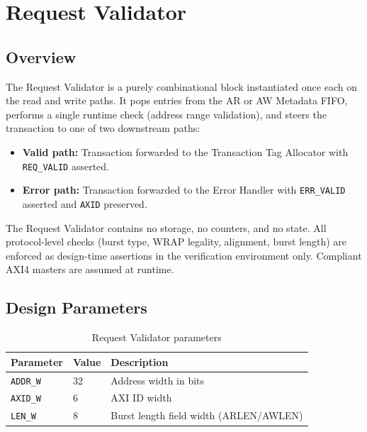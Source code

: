 \section{Request Validator}
\subsection{Overview}

The Request Validator is a purely combinational block instantiated once
each on the read and write paths. It pops entries from the AR or AW
Metadata FIFO, performs a single runtime check (address range
validation), and steers the transaction to one of two downstream paths:

\begin{itemize}
  \item \textbf{Valid path:} Transaction forwarded to the Transaction
        Tag Allocator with \texttt{REQ\_VALID} asserted.
  \item \textbf{Error path:} Transaction forwarded to the Error Handler
        with \texttt{ERR\_VALID} asserted and \texttt{AXID} preserved.
\end{itemize}

The Request Validator contains no storage, no counters, and no state.
All protocol-level checks (burst type, WRAP legality, alignment, burst
length) are enforced as design-time assertions in the verification
environment only. Compliant AXI4 masters are assumed at runtime.

\subsection{Design Parameters}

\begin{table}[h!]
\centering
\begin{tabular}{lll}
\toprule
\textbf{Parameter} & \textbf{Value} & \textbf{Description} \\
\midrule
\texttt{ADDR\_W}  & 32 & Address width in bits \\
\texttt{AXID\_W}  & 6  & AXI ID width \\
\texttt{LEN\_W}   & 8  & Burst length field width (ARLEN/AWLEN) \\
\bottomrule
\end{tabular}
\caption{Request Validator parameters}
\end{table}

